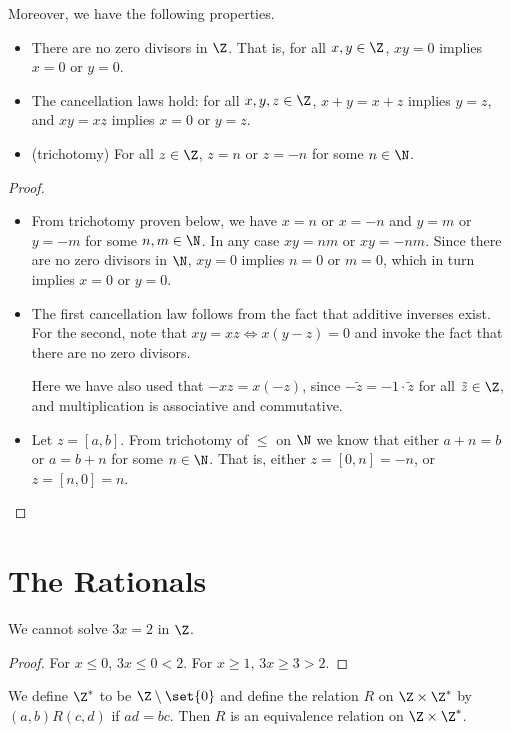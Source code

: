 Moreover, we have the following properties.
\begin{proposition*} \label{thm:Z:prop} \leavevmode
    \begin{itemize}
        \item There are no zero divisors in $\Z$.
        That is, for all $x, y \in \Z$, $xy = 0$ implies $x = 0$ or $y = 0$.
        \item The cancellation laws hold:
        for all $x, y, z \in \Z$, $x + y = x + z$ implies $y = z$,
        and $xy = xz$ implies $x = 0$ or $y = z$.
        \item (trichotomy) For all $z \in \Z$, $z = n$ or $z = -n$ for some
        $n \in \N$.
    \end{itemize}
\end{proposition*}
\begin{proof} \leavevmode
    \begin{itemize}
        \item From trichotomy proven below, we have $x = n$ or $x = -n$ and
        $y = m$ or $y = -m$ for some $n, m \in \N$.
        In any case $xy = nm$ or $xy = -nm$.
        Since there are no zero divisors in $\N$, $xy = 0$ implies $n = 0$ or
        $m = 0$, which in turn implies $x = 0$ or $y = 0$.
        \item The first cancellation law follows from the fact that additive
        inverses exist.
        For the second, note that $xy = xz \iff x(y - z) = 0$ and invoke the
        fact that there are no zero divisors.

        Here we have also used that $-xz = x(-z)$, since
        $-\tilde{z} = -1 \cdot \tilde{z}$ for all $\tilde{z} \in \Z$, and
        multiplication is associative and commutative.
        \item Let $z = [a, b]$.
        From trichotomy of $\le$ on $\N$ we know that either $a + n = b$ or
        $a = b + n$ for some $n \in \N$.
        That is, either $z = [0, n] = -n$, or $z = [n, 0] = n$. \qedhere
    \end{itemize}
\end{proof}

\section{The Rationals} \label{sec:rationals}
We cannot solve $3x = 2$ in $\Z$.
\begin{proof}
    For $x \le 0$, $3x \le 0 < 2$.
    For $x \ge 1$, $3x \ge 3 > 2$.
\end{proof}
We define $\Z^*$ to be $\Z \setminus \set{0}$ and define the relation $R$ on
$\Z \times \Z^*$ by $(a, b) R (c, d)$ if $ad = bc$.
Then $R$ is an equivalence relation on $\Z \times \Z^*$.

